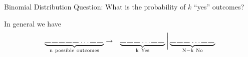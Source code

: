 \begin{frame}{Binomial Distribution}
    Question: What is the probability of $k$ ``yes'' outcomes?

  \vfill

  In general we have 
  \begin{eqnarray*}
    \underbrace{
      \rule{.3cm}{.2mm} \hspace{.05cm} 
      \rule{.3cm}{.2mm} \hspace{.05cm} 
      \rule{.3cm}{.2mm} \hspace{.05cm} 
      \rule{.3cm}{.2mm} \hspace{.05cm} 
      \rule{.3cm}{.2mm} \hspace{.05cm} \ldots
      \rule{.3cm}{.2mm} \hspace{.05cm} 
      \rule{.3cm}{.2mm} \hspace{.05cm}}_{\mathrm{n~possible~outcomes}}
    & \rightarrow & 
    \underbrace{
      \rule{.3cm}{.2mm} \hspace{.05cm} 
      \rule{.3cm}{.2mm} \hspace{.05cm} 
      \rule{.3cm}{.2mm} \hspace{.05cm} \ldots
      \rule{.3cm}{.2mm} \hspace{.05cm} 
      \rule{.3cm}{.2mm} \hspace{.05cm}}_{\mathrm{k~Yes}}
    \bigg|
    \underbrace{
      \rule{.3cm}{.2mm} \hspace{.05cm} 
      \rule{.3cm}{.2mm} \hspace{.05cm} 
      \rule{.3cm}{.2mm} \hspace{.05cm} \ldots
      \rule{.3cm}{.2mm} \hspace{.05cm} 
      \rule{.3cm}{.2mm} \hspace{.05cm}}_{\mathrm{N-k~No}}
  \end{eqnarray*}

\end{frame}

